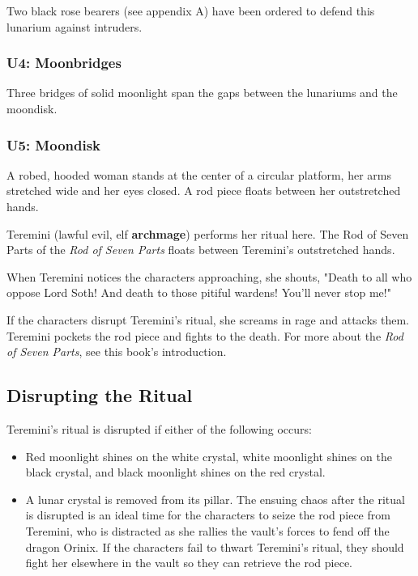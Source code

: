 \documentclass[10pt,a4paper,twoside,bg=print,twocolumn,openany,nodeprecatedcode]{dndbook}
\begin{document}
Two black rose bearers (see appendix A) have been ordered to defend this lunarium against intruders.

\subsubsection{U4: Moonbridges}
Three bridges of solid moonlight span the gaps between the lunariums and the moondisk.

\subsubsection{U5: Moondisk}
\begin{DndReadAloud}{}
A robed, hooded woman stands at the center of a circular platform, her arms stretched wide and her eyes closed. A rod piece floats between her outstretched hands.

\end{DndReadAloud}

Teremini (lawful evil, elf \textbf{archmage}) performs her ritual here. The Rod of Seven Parts of the \textit{Rod of Seven Parts} floats between Teremini's outstretched hands.

When Teremini notices the characters approaching, she shouts, "Death to all who oppose Lord Soth! And death to those pitiful wardens! You'll never stop me!"

If the characters disrupt Teremini's ritual, she screams in rage and attacks them. Teremini pockets the rod piece and fights to the death. For more about the \textit{Rod of Seven Parts}, see this book's introduction.

\subsection{Disrupting the Ritual}
Teremini's ritual is disrupted if either of the following occurs:


\begin{itemize}
\item Red moonlight shines on the white crystal, white moonlight shines on the black crystal, and black moonlight shines on the red crystal.
\item A lunar crystal is removed from its pillar. The ensuing chaos after the ritual is disrupted is an ideal time for the characters to seize the rod piece from Teremini, who is distracted as she rallies the vault's forces to fend off the dragon Orinix. If the characters fail to thwart Teremini's ritual, they should fight her elsewhere in the vault so they can retrieve the rod piece.
\end{itemize}
\end{document}
